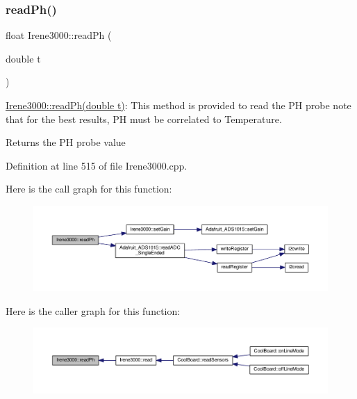\subsubsection{\texorpdfstring{read\+Ph()}{readPh()}}
{\footnotesize\ttfamily float Irene3000\+::read\+Ph (\begin{DoxyParamCaption}\item[{double}]{t }\end{DoxyParamCaption})}

\hyperlink{class_irene3000_a436fc0a06681cd0784aba56b9707f19a}{Irene3000\+::read\+Ph(double t)}\+: This method is provided to read the PH probe note that for the best results, PH must be correlated to Temperature.

\begin{DoxyReturn}{Returns}
the PH probe value 
\end{DoxyReturn}


Definition at line 515 of file Irene3000.\+cpp.

Here is the call graph for this function\+:\nopagebreak
\begin{figure}[H]
\begin{center}
\leavevmode
\includegraphics[width=350pt]{class_irene3000_a436fc0a06681cd0784aba56b9707f19a_cgraph}
\end{center}
\end{figure}
Here is the caller graph for this function\+:\nopagebreak
\begin{figure}[H]
\begin{center}
\leavevmode
\includegraphics[width=350pt]{class_irene3000_a436fc0a06681cd0784aba56b9707f19a_icgraph}
\end{center}
\end{figure}
\mbox{\label{class_irene3000_a80bc6dfea106dc3bc54fa20204d4d5dc}} 
